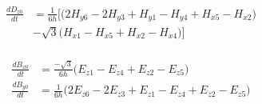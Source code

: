\documentclass{beamer}
\begin{document}
\begin{frame}
\begin{minipage}{.5\textwidth}
  \centering
\begin{align*}
\frac{d D_{z0}}{dt} &= \frac{1}{6h}\bigg[ \big( 2 H_{y6} - 2 H_{y3} + H_{y1} - H_{y4} + H_{x5} - H_{x2} \big) \\
&- \sqrt{3}\big(H_{x1}- H_{x5} + H_{x2} - H_{x4}\big) \bigg]\\
\end{align*}
\end{minipage}%
\begin{minipage}{.5\textwidth}
  \centering
\begin{align*}
\frac{d B_{x0}}{dt} &= \frac{-\sqrt{3}}{6h} \big( E_{z1} - E_{z4} + E_{z2} - E_{z5}  \big)\\
\frac{d B_{y0}}{dt}&= \frac{1}{6h} \big( 2E_{z6} -2E_{z3} + E_{z1} - E_{z4} + E_{z2} - E_{z5}  \big)
\end{align*}
\end{minipage}
\end{frame}
\end{document}
